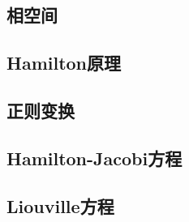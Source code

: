     \subsection{相空间}
    
    \subsection{Hamilton原理}
    
    \subsection{正则变换}
    
    \subsection{Hamilton-Jacobi方程}
    
    \subsection{Liouville方程}
    